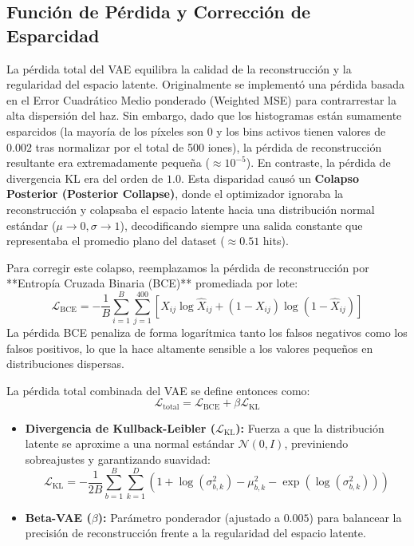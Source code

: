\documentclass[12pt,letterpaper]{article}
\begin{document}
\subsection{Función de Pérdida y Corrección de Esparcidad}
La pérdida total del VAE equilibra la calidad de la reconstrucción y la regularidad del espacio latente. 
Originalmente se implementó una pérdida basada en el Error Cuadrático Medio ponderado (Weighted MSE) para contrarrestar la alta dispersión del haz. Sin embargo, dado que los histogramas están sumamente esparcidos (la mayoría de los píxeles son $0$ y los bins activos tienen valores de $0.002$ tras normalizar por el total de 500 iones), la pérdida de reconstrucción resultante era extremadamente pequeña ($\approx 10^{-5}$). En contraste, la pérdida de divergencia KL era del orden de $1.0$. Esta disparidad causó un \textbf{Colapso Posterior (Posterior Collapse)}, donde el optimizador ignoraba la reconstrucción y colapsaba el espacio latente hacia una distribución normal estándar ($\mu \rightarrow 0, \sigma \rightarrow 1$), decodificando siempre una salida constante que representaba el promedio plano del dataset ($\approx 0.51$ hits).

Para corregir este colapso, reemplazamos la pérdida de reconstrucción por **Entropía Cruzada Binaria (BCE)** promediada por lote:
\begin{equation}
    \mathcal{L}_{\text{BCE}} = -\frac{1}{B} \sum_{i=1}^B \sum_{j=1}^{400} \left[ X_{ij} \log \hat{X}_{ij} + (1 - X_{ij}) \log (1 - \hat{X}_{ij}) \right]
\end{equation}
La pérdida BCE penaliza de forma logarítmica tanto los falsos negativos como los falsos positivos, lo que la hace altamente sensible a los valores pequeños en distribuciones dispersas.

La pérdida total combinada del VAE se define entonces como:
\begin{equation}
    \mathcal{L}_{\text{total}} = \mathcal{L}_{\text{BCE}} + \beta \mathcal{L}_{\text{KL}}
\end{equation}
\begin{itemize}
    \item \textbf{Divergencia de Kullback-Leibler ($\mathcal{L}_{\text{KL}}$):} Fuerza a que la distribución latente se aproxime a una normal estándar $\mathcal{N}(0, I)$, previniendo sobreajustes y garantizando suavidad:
    \begin{equation}
        \mathcal{L}_{\text{KL}} = -\frac{1}{2 B} \sum_{b=1}^{B} \sum_{k=1}^{D} \left( 1 + \log(\sigma_{b,k}^2) - \mu_{b,k}^2 - \exp(\log(\sigma_{b,k}^2)) \right)
    \end{equation}
    \item \textbf{Beta-VAE ($\beta$):} Parámetro ponderador (ajustado a $0.005$) para balancear la precisión de reconstrucción frente a la regularidad del espacio latente.
\end{itemize}
\end{document}
